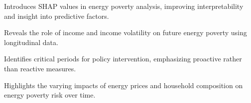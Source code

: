 \documentclass[preprint,authoryear,12pt]{elsarticle}
\begin{document}
\begin{frontmatter}



\begin{highlights}
\item Introduces SHAP values in energy poverty analysis, improving interpretability and insight into predictive factors.
\item Reveals the role of income and income volatility on future energy poverty using longitudinal data.
\item Identifies critical periods for policy intervention, emphasizing proactive rather than reactive measures.
\item Highlights the varying impacts of energy prices and household composition on energy poverty risk over time.
\end{highlights}


\end{frontmatter}
\end{document}
